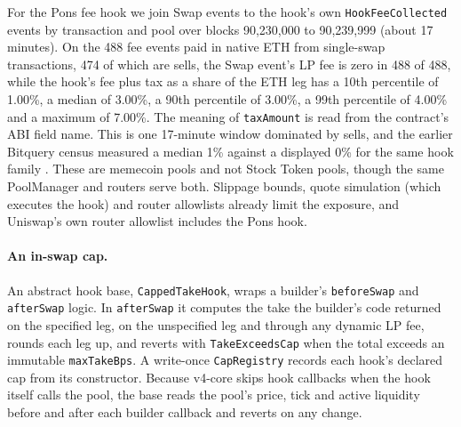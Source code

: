 \documentclass[11pt]{article}
\begin{document}
For the Pons fee hook we join Swap events to the hook's own \texttt{HookFeeCollected} events by transaction and pool over blocks 90,230,000 to 90,239,999 (about 17 minutes). On the 488 fee events paid in native ETH from single-swap transactions, 474 of which are sells, the Swap event's LP fee is zero in 488 of 488, while the hook's fee plus tax as a share of the ETH leg has a 10th percentile of 1.00\%, a median of 3.00\%, a 90th percentile of 3.00\%, a 99th percentile of 4.00\% and a maximum of 7.00\%. The meaning of \texttt{taxAmount} is read from the contract's ABI field name. This is one 17-minute window dominated by sells, and the earlier Bitquery census measured a median 1\% against a displayed 0\% for the same hook family \citep{bitquery2026hooks}. These are memecoin pools and not Stock Token pools, though the same PoolManager and routers serve both. Slippage bounds, quote simulation (which executes the hook) and router allowlists already limit the exposure, and Uniswap's own router allowlist includes the Pons hook.

\paragraph{An in-swap cap.} An abstract hook base, \texttt{CappedTakeHook}, wraps a builder's \texttt{beforeSwap} and \texttt{afterSwap} logic. In \texttt{afterSwap} it computes the take the builder's code returned on the specified leg, on the unspecified leg and through any dynamic LP fee, rounds each leg up, and reverts with \texttt{TakeExceedsCap} when the total exceeds an immutable \texttt{maxTakeBps}. A write-once \texttt{CapRegistry} records each hook's declared cap from its constructor. Because v4-core skips hook callbacks when the hook itself calls the pool, the base reads the pool's price, tick and active liquidity before and after each builder callback and reverts on any change.
\end{document}
